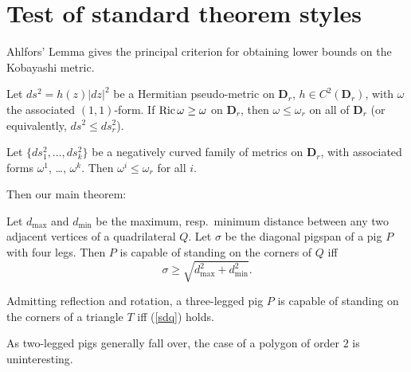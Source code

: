 \addtolength{\textwidth}{8pt}


\maketitle

\section{Test of standard theorem styles}

Ahlfors' Lemma gives the principal criterion for obtaining lower bounds
on the Kobayashi metric.

\begin{Ahlfors}
Let $ds^2 = h(z)\lvert dz\rvert^2$ be a Hermitian pseudo-metric on
$\mathbf{D}_r$, $h\in C^2(\mathbf{D}_r)$, with $\omega$ the associated
$(1,1)$-form. If $\mathop{\mathrm{Ric}}\nolimits\omega\geq\omega$ on $\mathbf{D}_r$,
then $\omega\leq\omega_r$ on all of $\mathbf{D}_r$ (or equivalently,
$ds^2\leq ds_r^2$).
\end{Ahlfors}

\begin{lem}
Let $\{ds_1^2,\dots,ds_k^2\}$ be a negatively curved family of metrics
on $\mathbf{D}_r$, with associated forms $\omega^1$, \dots, $\omega^k$.
Then $\omega^i \leq\omega_r$ for all $i$.
\end{lem}

Then our main theorem:
\begin{thm}\label{pigspan}
Let $d_{\max}$ and $d_{\min}$ be the maximum, resp.\ minimum distance
between any two adjacent vertices of a quadrilateral $Q$. Let $\sigma$
be the diagonal pigspan of a pig $P$ with four legs.
Then $P$ is capable of standing on the corners of $Q$ iff
\begin{equation}\label{sdq}
\sigma\geq \sqrt{d_{\max}^2+d_{\min}^2}.
\end{equation}
\end{thm}

\begin{cor}
Admitting reflection and rotation, a three-legged pig $P$ is capable of
standing on the corners of a triangle $T$ iff (\ref{sdq}) holds.
\end{cor}

\begin{rmk}
As two-legged pigs generally fall over, the case of a polygon of order
$2$ is uninteresting.
\end{rmk}

